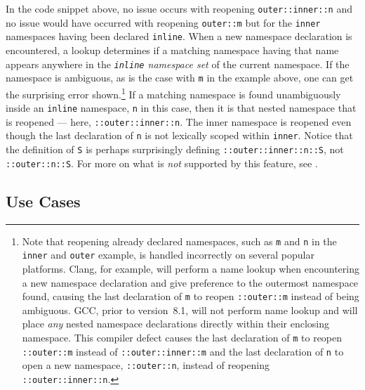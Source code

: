\noindent In the code snippet above, no issue occurs with reopening
\lstinline!outer::inner::n! and no issue would have occurred with reopening
\lstinline!outer::m! but for the \lstinline!inner! namespaces having been
declared \lstinline!inline!. When a new namespace declaration is
encountered, a lookup determines if a matching namespace having that
name appears anywhere in the \emph{\lstinline!inline! namespace set} of the
current namespace. If the namespace is ambiguous, as is the case with
\lstinline!m! in the example above, one can get the surprising error shown.{\cprotect\footnote{Note that reopening already declared
namespaces, such as \lstinline!m! and \lstinline!n! in the \lstinline!inner!
and \lstinline!outer! example, is handled incorrectly on several
popular platforms. Clang, for example, will perform a name lookup when
encountering a new namespace declaration and give preference to the
outermost namespace found, causing the last declaration of \lstinline!m!
to reopen \lstinline!::outer::m! instead of being ambiguous. GCC, prior
to version~8.1, will not perform name lookup and will place \emph{any}
nested namespace declarations directly within their enclosing
namespace. This compiler defect causes the last declaration of
\lstinline!m! to reopen \lstinline!::outer::m! instead of
\lstinline!::outer::inner::m! and the last declaration of \lstinline!n! to
open a new namespace, \lstinline!::outer::n!, instead of reopening
  \lstinline!::outer::inner::n!.}} If a matching namespace is found
unambiguously inside an \lstinline!inline! namespace, \lstinline!n! in this
case, then it is that nested namespace that is reopened --- here,
\lstinline!::outer::inner::n!. The inner namespace is reopened even though
the last declaration of \lstinline!n! is not lexically scoped within
\lstinline!inner!. Notice that the definition of \lstinline!S! is perhaps
surprisingly defining \lstinline!::outer::inner::n::S!, not
\lstinline!::outer::n::S!. For more on what is \emph{not} supported by this
feature, see .

\subsection[Use Cases]{Use Cases}\label{use-cases-inlinenamespace}

